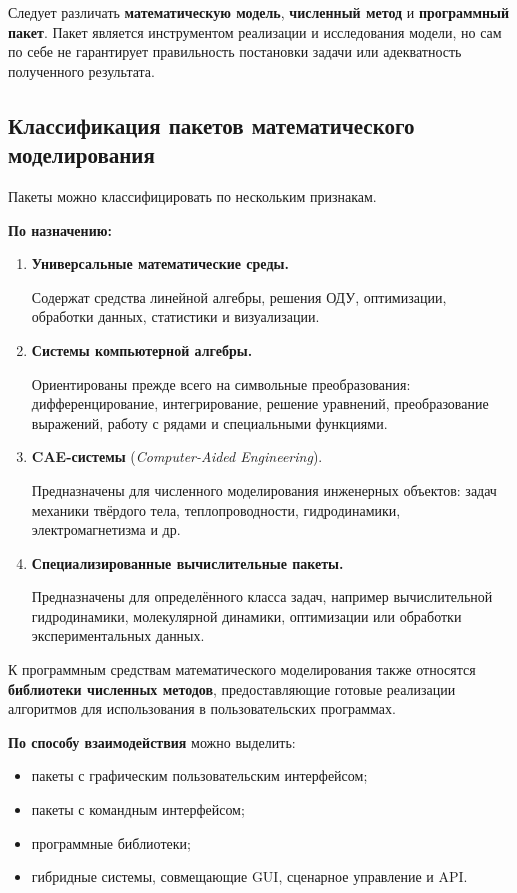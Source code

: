 Следует различать \textbf{математическую модель}, \textbf{численный метод} и \textbf{программный пакет}. Пакет является инструментом реализации и исследования модели, но сам по себе не гарантирует правильность постановки задачи или адекватность полученного результата.

\subsection{Классификация пакетов математического моделирования}

Пакеты можно классифицировать по нескольким признакам.

\textbf{По назначению:}
\begin{enumerate}
	\item \textbf{Универсальные математические среды.}
	
	Содержат средства линейной алгебры, решения ОДУ, оптимизации, обработки данных, статистики и визуализации.
	
	\item \textbf{Системы компьютерной алгебры.}
	
	Ориентированы прежде всего на символьные преобразования: дифференцирование, интегрирование, решение уравнений, преобразование выражений, работу с рядами и специальными функциями.
	
	\item \textbf{CAE-системы} (\textit{Computer-Aided Engineering}).
	
	Предназначены для численного моделирования инженерных объектов: задач механики твёрдого тела, теплопроводности, гидродинамики, электромагнетизма и др.
	
	\item \textbf{Специализированные вычислительные пакеты.}
	
	Предназначены для определённого класса задач, например вычислительной гидродинамики, молекулярной динамики, оптимизации или обработки экспериментальных данных.
\end{enumerate}

К программным средствам математического моделирования также относятся \textbf{библиотеки численных методов}, предоставляющие готовые реализации алгоритмов для использования в пользовательских программах.

\textbf{По способу взаимодействия} можно выделить:
\begin{itemize}
	\item пакеты с графическим пользовательским интерфейсом;
	\item пакеты с командным интерфейсом;
	\item программные библиотеки;
	\item гибридные системы, совмещающие GUI, сценарное управление и API.
\end{itemize}


